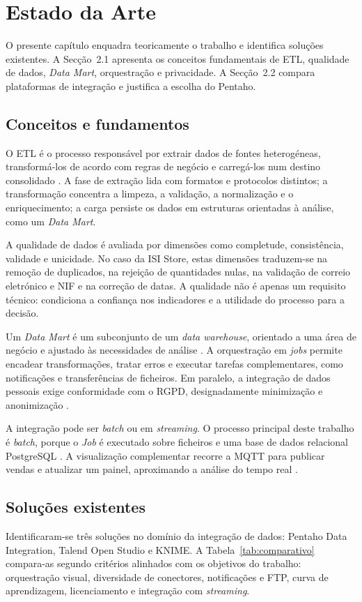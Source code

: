 \documentclass[11pt,a4paper]{article}
\begin{document}
\section{Estado da Arte}
O presente capítulo enquadra teoricamente o trabalho e identifica soluções existentes. A Secção~2.1 apresenta os conceitos fundamentais de ETL, qualidade de dados, \textit{Data Mart}, orquestração e privacidade. A Secção~2.2 compara plataformas de integração e justifica a escolha do Pentaho.

\subsection{Conceitos e fundamentos}
O ETL é o processo responsável por extrair dados de fontes heterogéneas, transformá-los de acordo com regras de negócio e carregá-los num destino consolidado \cite{kimball2013datawarehouse}. A fase de extração lida com formatos e protocolos distintos; a transformação concentra a limpeza, a validação, a normalização e o enriquecimento; a carga persiste os dados em estruturas orientadas à análise, como um \textit{Data Mart}.

A qualidade de dados é avaliada por dimensões como completude, consistência, validade e unicidade. No caso da ISI Store, estas dimensões traduzem-se na remoção de duplicados, na rejeição de quantidades nulas, na validação de correio eletrónico e NIF e na correção de datas. A qualidade não é apenas um requisito técnico: condiciona a confiança nos indicadores e a utilidade do processo para a decisão.

Um \textit{Data Mart} é um subconjunto de um \textit{data warehouse}, orientado a uma área de negócio e ajustado às necessidades de análise \cite{kimball2013datawarehouse}. A orquestração em \textit{jobs} permite encadear transformações, tratar erros e executar tarefas complementares, como notificações e transferências de ficheiros. Em paralelo, a integração de dados pessoais exige conformidade com o RGPD, designadamente minimização e anonimização \cite{rgpd2016}.

A integração pode ser \textit{batch} ou em \textit{streaming}. O processo principal deste trabalho é \textit{batch}, porque o \textit{Job} é executado sobre ficheiros e uma base de dados relacional PostgreSQL \cite{postgresql2026}. A visualização complementar recorre a MQTT para publicar vendas e atualizar um painel, aproximando a análise do tempo real \cite{nodered2026,mosquitto2026}.

\subsection{Soluções existentes}
Identificaram-se três soluções no domínio da integração de dados: Pentaho Data Integration, Talend Open Studio e KNIME. A Tabela~\ref{tab:comparativo} compara-as segundo critérios alinhados com os objetivos do trabalho: orquestração visual, diversidade de conectores, notificações e FTP, curva de aprendizagem, licenciamento e integração com \textit{streaming}.
\end{document}

